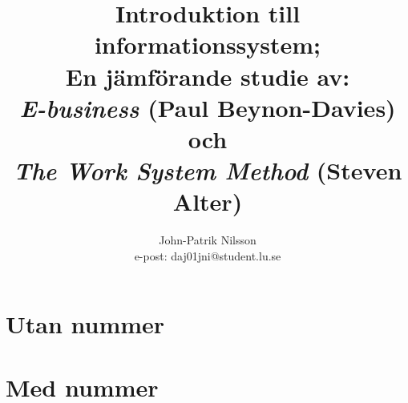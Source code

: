 \documentclass[12pt,a4paper,titlepage]{article}
\title{\textsf{\textbf{Introduktion till informationssystem; \\ 
    En jämförande studie av: \\
    \textit{E-business} (Paul Beynon-Davies) och \\
    \textit{The Work System Method} (Steven Alter)}}}
\author{John-Patrik Nilsson \\
	e-post: daj01jni@student.lu.se}
\begin{document}

\pagestyle{headings}
\thispagestyle{empty}

\maketitle

\section*{\textsf{Utan nummer}}

\section{\textsf{Med nummer}}

\end{document}
